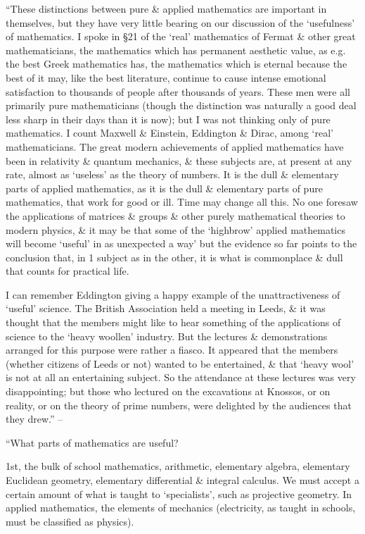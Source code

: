 \documentclass{article}
\numberwithin{equation}{section}
\begin{document}
 ``These distinctions between pure \& applied mathematics are important in themselves, but they have very little bearing on our discussion of the `usefulness' of mathematics. I spoke in \S21 of the `real' mathematics of Fermat \& other great mathematicians, the mathematics which has permanent aesthetic value, as e.g. the best Greek mathematics has, the mathematics which is eternal because the best of it may, like the best literature, continue to cause intense emotional satisfaction to thousands of people after thousands of years. These men were all primarily pure mathematicians (though the distinction was naturally a good deal less sharp in their days than it is now); but I was not thinking only of pure mathematics. I count Maxwell \& Einstein, Eddington \& Dirac, among `real' mathematicians. The great modern achievements of applied mathematics have been in relativity \& quantum mechanics, \& these subjects are, at present at any rate, almost as `useless' as the theory of numbers. It is the dull \& elementary parts of applied mathematics, as it is the dull \& elementary parts of pure mathematics, that work for good or ill. Time may change all this. No one foresaw the applications of matrices \& groups \& other purely mathematical theories to modern physics, \& it may be that some of the `highbrow' applied mathematics will become `useful' in as unexpected a way' but the evidence so far points to the conclusion that, in 1 subject as in the other, it is what is commonplace \& dull that counts for practical life.

I can remember Eddington giving a happy example of the unattractiveness of `useful' science. The British Association held a meeting in Leeds, \& it was thought that the members might like to hear something of the applications of science to the `heavy woollen' industry. But the lectures \& demonstrations arranged for this purpose were rather a fiasco. It appeared that the members (whether citizens of Leeds or not) wanted to be entertained, \& that `heavy wool' is not at all an entertaining subject. So the attendance at these lectures was very disappointing; but those who lectured on the excavations at Knossos, or on reality, or on the theory of prime numbers, were delighted by the audiences that they drew.'' -- \cite[pp. 131--133]{Hardy1992}

 ``What parts of mathematics are useful?

1st, the bulk of school mathematics, arithmetic, elementary algebra, elementary Euclidean geometry, elementary differential \& integral calculus. We must accept a certain amount of what is taught to `specialists', such as projective geometry. In applied mathematics, the elements of mechanics (electricity, as taught in schools, must be classified as physics).
\end{document}
